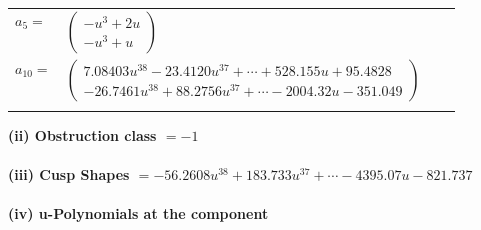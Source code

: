 \documentclass[1p]{elsarticle_modified}
\theoremstyle{definition}
\begin{document}
\begin{tabular}{m{7pt} m{180pt} m{7pt} m{180pt} }
\flushright $a_{5}=$&$\begin{pmatrix}- u^3+2 u\\- u^3+u\end{pmatrix}$ \\
\flushright $a_{10}=$&$\begin{pmatrix}7.08403 u^{38}-23.4120 u^{37}+\cdots+528.155 u+95.4828\\-26.7461 u^{38}+88.2756 u^{37}+\cdots-2004.32 u-351.049\end{pmatrix}$\\&\end{tabular}
\flushleft \textbf{(ii) Obstruction class $= -1$}\\~\\
\flushleft \textbf{(iii) Cusp Shapes $= -56.2608 u^{38}+183.733 u^{37}+\cdots-4395.07 u-821.737$}\\~\\
\newpage\renewcommand{\arraystretch}{1}
\flushleft \textbf{(iv) u-Polynomials at the component}\newline \\
\end{document}

